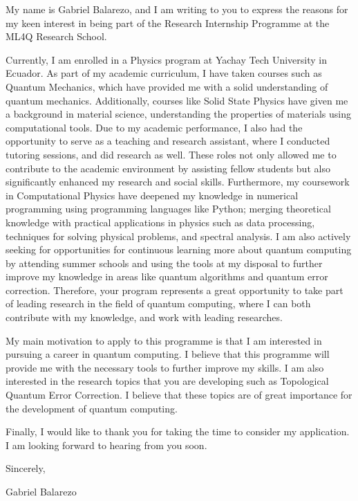 \documentclass[
	11pt, %
]{letter}
\begin{document}
My name is Gabriel Balarezo, and I am writing to you to express the reasons for my keen interest in being part of the Research Internship Programme at the ML4Q Research School.

Currently, I am enrolled in a Physics program at Yachay Tech University in Ecuador. As part of my academic curriculum, I have taken courses such as Quantum Mechanics, which have provided me with a solid understanding of quantum mechanics. Additionally, courses like Solid State Physics have given me a background in material science, understanding the properties of materials using computational tools. Due to my academic performance, I also had the opportunity to serve as a teaching and research assistant, where I conducted tutoring sessions, and did research as well. These roles not only allowed me to contribute to the academic environment by assisting fellow students but also significantly enhanced my research and social skills. Furthermore, my coursework in Computational Physics have deepened my knowledge in numerical programming using programming languages like Python; merging theoretical knowledge with practical applications in physics such as data processing, techniques for solving physical problems, and spectral analysis. I am also actively seeking for opportunities for continuous learning more about quantum computing by attending summer schools and using the tools at my disposal to further improve my knowledge in areas like quantum algorithms and quantum error correction. Therefore, your program represents a great opportunity to take part of leading research in the field of quantum computing, where I can both contribute with my knowledge, and work with leading researches. 


My main motivation to apply to this programme is that I am interested in pursuing a career in quantum computing. I believe that this programme will provide me with the necessary tools to further improve my skills. I am also interested in the research topics that you are developing such as Topological Quantum Error Correction. I believe that these topics are of great importance for the development of quantum computing.  

Finally, I would like to thank you for taking the time to consider my application. I am looking forward to hearing from you soon.


\smallskip %

Sincerely,

\bigskip %
Gabriel Balarezo 
\end{document}
